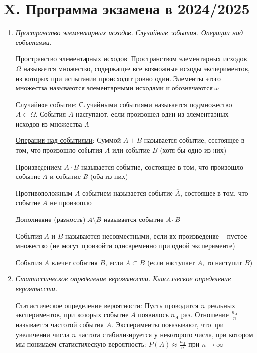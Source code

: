 \clearpage

\section{X. Программа экзамена в 2024/2025}

\begin{enumerate}
    \item \textit{Пространство элементарных исходов. Случайные события. Операции над событиями.}

    \hyperlink{spaceofelementaryoutcomes}{Пространство элементарных исходов}: Пространством элементарных исходов $\Omega$ называется множество, содержащее все возможные исходы
    экспериментов, из которых при испытании происходит ровно один. Элементы этого множества называются
    элементарными исходами и обозначаются $\omega$

    \hyperlink{randomeventdefinition}{Случайное событие}: Случайными событиями называется подмножество $A \subset \Omega$. События $A$ наступают, если произошел один из
    элементарных исходов из множества $A$

    \hyperlink{randomeventoperations}{Операции над событиями}: Суммой $A + B$ называется событие, состоящее в том, что произошло события $A$ или событие $B$ (хотя бы одно из них)

    Произведением $A \cdot B$ называется событие, состоящее в том, что произошло событие $A$ и событие $B$ (оба из них)

    Противоположным $A$ событием называется событие $\overline{A}$, состоящее в том, что событие $A$ не произошло

    Дополнение (разность) $A \setminus B$ называется событие $A \cdot \overline{B}$

    События $A$ и $B$ называются несовместными, если их произведение -- пустое множество
    (не могут произойти одновременно при одной эксперименте)

    События $A$ влечет события $B$, если $A \subset B$ (если наступает $A$, то наступит $B$)

    \item \textit{Статистическое определение вероятности. Классическое определение вероятности.}

    \hyperlink{statisticaldefinitionofprobability}{Статистическое определение вероятности}: Пусть проводится $n$ реальных экспериментов, при которых событие $A$ появилось $n_A$ раз.
    Отношение $\frac{n_A}{n}$ называется частотой события $A$.
    Эксперименты показывают, что при увеличении числа $n$ частота стабилизируется у некоторого числа,
    при котором мы понимаем статистическую вероятность: $P(A) \approx \frac{n_A}{n}$ при $n \to \infty$


\end{enumerate}
